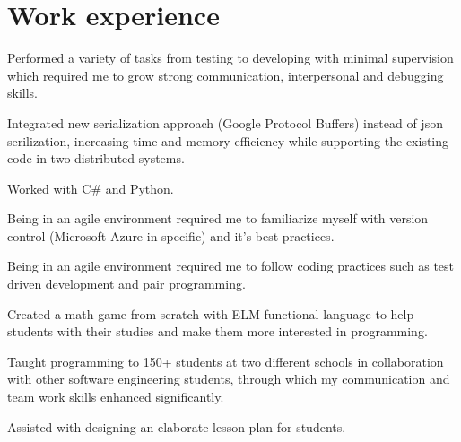 \documentclass[]{farzad-resume}
\begin{document}
\begin{minipage}[t]{0.66\textwidth}



\section{Work experience}
{}
\vspace{\topsep}
\begin{tightemize}
    \item {\fontsize{10.5}{12.6} \selectfont Performed a variety of tasks from testing to developing with minimal supervision which required me to grow strong communication, interpersonal and debugging skills.
	\item Integrated new serialization approach (Google Protocol Buffers) instead of json serilization, increasing time and memory efficiency while supporting the existing code in two distributed systems.
	\item Worked with C\# and Python.
	\item Being in an agile environment required me to familiarize myself with version control (Microsoft Azure in specific) and it's best practices.
	\item Being in an agile environment required me to follow coding practices such as test driven development and pair programming.}
\end{tightemize}
\sectionsep

\vspace{\topsep}
\vspace{\topsep}
\begin{tightemize}
  \item Created a math game from scratch with ELM functional language to help students with their studies and make them more interested in programming.
  \item Taught programming to 150+ students at two different schools in collaboration with other software engineering students, through which my communication and team work skills enhanced significantly.
  \item Assisted with designing an elaborate lesson plan for students.
\end{tightemize}
\sectionsep



\end{minipage}
\end{document}
